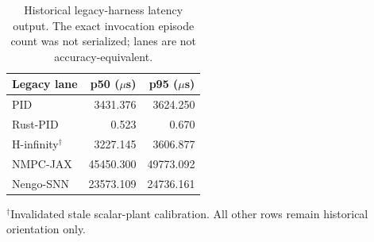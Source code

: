 \begin{table}[ht]
\centering
\caption{Historical legacy-harness latency output. The exact invocation episode count was not serialized; lanes are not accuracy-equivalent.}
\label{tab:historical-latency}
\begin{tabular}{lrr}
\toprule
Legacy lane & p50 ($\mu$s) & p95 ($\mu$s) \\
\midrule
PID & 3431.376 & 3624.250 \\
Rust-PID & 0.523 & 0.670 \\
H-infinity$^{\dagger}$ & 3227.145 & 3606.877 \\
NMPC-JAX & 45450.300 & 49773.092 \\
Nengo-SNN & 23573.109 & 24736.161 \\
\bottomrule
\end{tabular}
\vspace{2pt}
\parbox{0.92\linewidth}{\footnotesize $^{\dagger}$Invalidated stale scalar-plant calibration. All other rows remain historical orientation only.}
\end{table}
